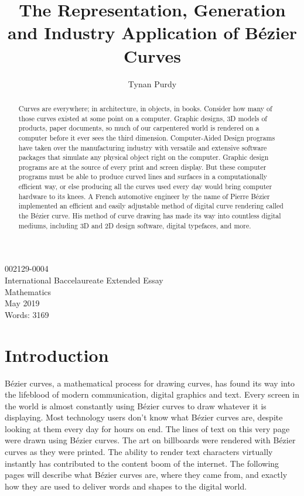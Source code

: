 \documentclass[12pt,letterpaper]{article}
\title{The Representation, Generation and Industry Application of B\'ezier Curves}
\author{Tynan Purdy}
\date{\vspace{-5ex}}
\begin{document}
\large
\parindent=0.5in
{\fontsize{12}{14.4}
	{\singlespace
	    \maketitle
	    \begin{center}
	    \vspace{4mm}
	    002129-0004 \\
	    \vspace{4mm}
	    International Baccelaureate Extended Essay \\
	    \vspace{4mm}
	    Mathematics \\
	    \vspace{4mm}
	    May 2019 \\
	    \vspace{4mm}
	    Words: 3169 \\
	\end{center}
	}
}	

\newpage
{}
\begin{abstract}
Curves are everywhere; in architecture, in objects, in books. Consider how many of those curves existed at some point on a computer. Graphic designs, 3D models of products, paper documents, so much of our carpentered world is rendered on a computer before it ever sees the third dimension. Computer-Aided Design programs have taken over the manufacturing industry with versatile and extensive software packages that simulate any physical object right on the computer. Graphic design programs are at the source of every print and screen display. But these computer programs must be able to produce curved lines and surfaces in a computationally efficient way, or else producing all the curves used every day would bring computer hardware to its knees. A French automotive engineer by the name of Pierre B\'ezier implemented an efficient and easily adjustable method of digital curve rendering called the B\'ezier curve. His method of curve drawing has made its way into countless digital mediums, including 3D and 2D design software, digital typefaces, and more.
\end{abstract}

\newpage
\tableofcontents

\newpage
\section{Introduction}
Bézier curves, a mathematical process for drawing curves, has found its way into the lifeblood of modern communication, digital graphics and text. Every screen in the world is almost constantly using Bézier curves to draw whatever it is displaying. Most technology users don’t know what Bézier curves are, despite looking at them every day for hours on end.  The lines of text on this very page were drawn using Bézier curves. The art on billboards were rendered with Bézier curves as they were printed. The ability to render text characters virtually instantly has contributed to the content boom of the internet. The following pages will describe what Bézier curves are, where they came from, and exactly how they are used to deliver words and shapes to the digital world.
\end{document}
